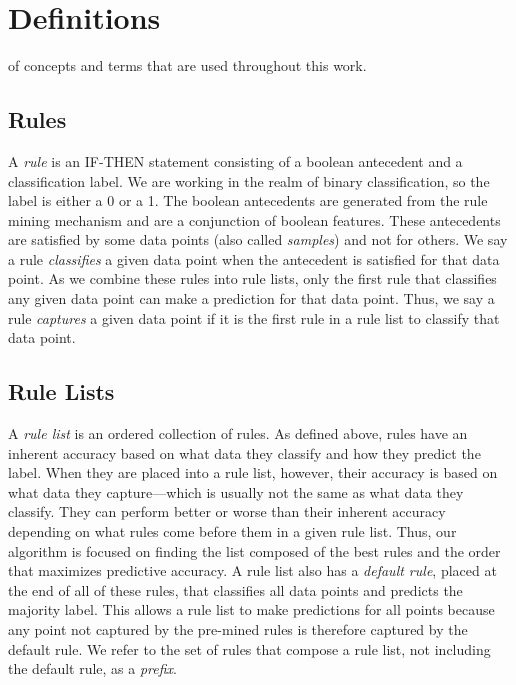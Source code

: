 \chapter{Definitions}\label{ch:definitions}
 of concepts and terms that are used throughout this work.

\section{Rules}
A \textit{rule} is an IF-THEN statement consisting of a boolean antecedent and a classification label.
We are working in the realm of binary classification, so the label is either a 0 or a 1.
The boolean antecedents are generated from the rule mining mechanism and are a conjunction of boolean features.
These antecedents are satisfied by some data points (also called \textit{samples}) and not for others.
We say a rule \textit{classifies} a given data point when the antecedent is satisfied for that data point.
As we combine these rules into rule lists, only the first rule that classifies any given data point can make a prediction for that data point.
Thus, we say a rule \textit{captures} a given data point if it is the first rule in a rule list to classify that data point.

\section{Rule Lists}
A \textit{rule list} is an ordered collection of rules.
As defined above, rules have an inherent accuracy based on what data they classify and how they predict the label.
When they are placed into a rule list, however, their accuracy is based on what data they capture---which is usually not the same as what data they classify.
They can perform better or worse than their inherent accuracy depending on what rules come before them in a given rule list.
Thus, our algorithm is focused on finding the list composed of the best rules and the order that maximizes predictive accuracy.
A rule list also has a \textit{default rule}, placed at the end of all of these rules, that classifies all data points and predicts the majority label.
This allows a rule list to make predictions for all points because any point not captured by the pre-mined rules is therefore captured by the default rule.
We refer to the set of rules that compose a rule list, not including the default rule, as a \textit{prefix}.


